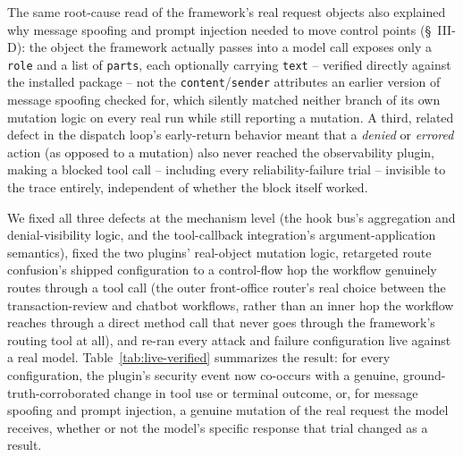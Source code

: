 \documentclass[conference]{IEEEtran}
\begin{document}
The same root-cause read of the framework's real request objects also explained why message spoofing and prompt injection needed to move control points (\S~III-D): the object the framework actually passes into a model call exposes only a \texttt{role} and a list of \texttt{parts}, each optionally carrying \texttt{text} -- verified directly against the installed package -- not the \texttt{content}/\texttt{sender} attributes an earlier version of message spoofing checked for, which silently matched neither branch of its own mutation logic on every real run while still reporting a mutation. A third, related defect in the dispatch loop's early-return behavior meant that a \emph{denied} or \emph{errored} action (as opposed to a mutation) also never reached the observability plugin, making a blocked tool call -- including every reliability-failure trial -- invisible to the trace entirely, independent of whether the block itself worked.

We fixed all three defects at the mechanism level (the hook bus's aggregation and denial-visibility logic, and the tool-callback integration's argument-application semantics), fixed the two plugins' real-object mutation logic, retargeted route confusion's shipped configuration to a control-flow hop the workflow genuinely routes through a tool call (the outer front-office router's real choice between the transaction-review and chatbot workflows, rather than an inner hop the workflow reaches through a direct method call that never goes through the framework's routing tool at all), and re-ran every attack and failure configuration live against a real model. Table~\ref{tab:live-verified} summarizes the result: for every configuration, the plugin's security event now co-occurs with a genuine, ground-truth-corroborated change in tool use or terminal outcome, or, for message spoofing and prompt injection, a genuine mutation of the real request the model receives, whether or not the model's specific response that trial changed as a result.
\end{document}
